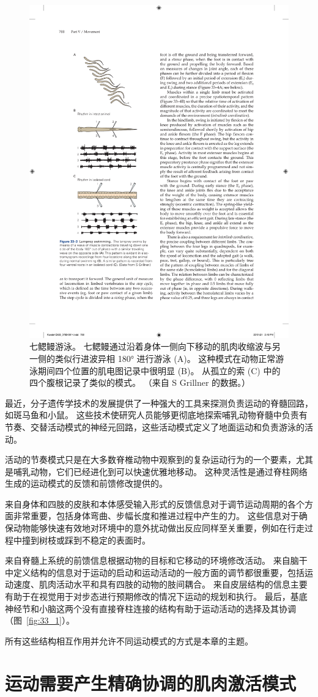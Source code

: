 \begin{figure}[htbp]
	\centering
	\includegraphics[width=0.4\linewidth]{chap33/fig_33_3}
	\caption{七鳃鳗游泳。
	七鳃鳗通过沿着身体一侧向下移动的肌肉收缩波与另一侧的类似行进波异相 180° 进行游泳 (A)。
	这种模式在动物正常游泳期间四个位置的肌电图记录中很明显 (B)。
	从孤立的索 (C) 中的四个腹根记录了类似的模式。 （来自 S Grillner 的数据。）}
	\label{fig:33_3}
\end{figure}


最近，分子遗传学技术的发展提供了一种强大的工具来探测负责运动的脊髓回路，如斑马鱼和小鼠。
这些技术使研究人员能够更彻底地探索哺乳动物脊髓中负责有节奏、交替活动模式的神经元回路，这些活动模式定义了地面运动和负责游泳的活动。


活动的节奏模式只是在大多数脊椎动物中观察到的复杂运动行为的一个要素，尤其是哺乳动物，它们已经进化到可以快速优雅地移动。
这种灵活性是通过脊柱网络生成的运动模式的反馈和前馈修改提供的。


来自身体和四肢的皮肤和本体感受输入形式的反馈信息对于调节运动周期的各个方面非常重要，包括身体弯曲、步幅长度和推进过程中产生的力。
这些信息对于确保动物能够快速有效地对环境中的意外扰动做出反应同样至关重要，例如在行走过程中撞到树枝或踩到不稳定的表面时。


来自脊髓上系统的前馈信息根据动物的目标和它移动的环境修改活动。
来自脑干中定义结构的信息对于运动的启动和运动活动的一般方面的调节都很重要，包括运动速度、肌肉活动水平和具有四肢的动物的肢间耦合。
来自皮层结构的信息主要有助于在视觉用于对步态进行预期修改的情况下运动的规划和执行。
最后，基底神经节和小脑这两个没有直接脊柱连接的结构有助于运动活动的选择及其协调（图~\ref{fig:33_1}）。


所有这些结构相互作用并允许不同运动模式的方式是本章的主题。



\section{运动需要产生精确协调的肌肉激活模式}

